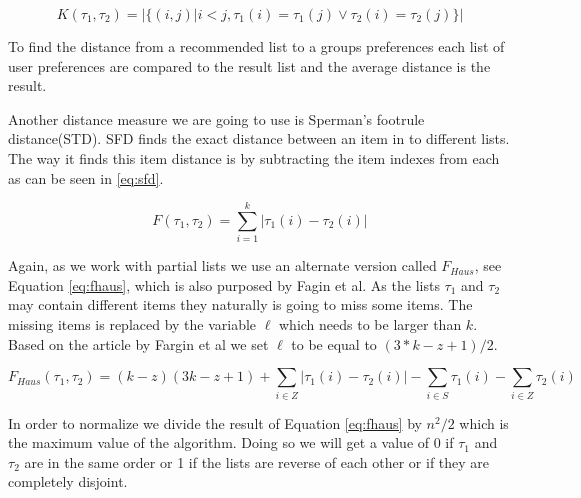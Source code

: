 

\begin{equation}\label{eq:kendalldistance3}
K(\tau_1,\tau_2) = | \{(i,j) | i < j, \tau_1 (i) = \tau_1 (j) \lor \tau_2 (i) = \tau_2 (j) \} |
\end{equation}

To find the distance from a recommended list to a groups preferences each list of user preferences are compared to the result list and the average distance is the result. 


Another distance measure we are going to use is Sperman's footrule distance(STD). SFD finds the exact distance between an item in to different lists. The way it finds this item distance is by subtracting the item indexes from each as can be seen in \ref{eq:sfd}. 

\begin{equation}\label{eq:sfd}
F(\tau_1, \tau_2) = \sum_{i=1}^{k} | \tau_1 (i) - \tau_2 (i) |
\end{equation}

Again, as we work with partial lists we use an alternate version called $F_{Haus}$, see Equation \ref{eq:fhaus}, which is also purposed by Fagin et al\citep{comparing:topk}.
As the lists $\tau_1$ and $\tau_2$ may contain different items they naturally is going to miss some items. The missing items is replaced by the variable $\ell$ which needs to be larger than $k$. Based on the article by Fargin et al we set $\ell$ to be equal to $(3 * k - z + 1)/2$.

\footnotesize
\begin{equation}\label{eq:fhaus}
F_{Haus}(\tau_1,\tau_2)= (k-z)(3k-z+1)+\sum_{i\in Z} | \tau_1 (i) - \tau_2 (i) | - \sum_{i\in S} \tau_1 (i) - \sum_{i\in Z} \tau_2(i)
\end{equation}
\normalsize

In order to normalize we divide the result of Equation \ref{eq:fhaus} by $n^2 /2$ which is the maximum value of the algorithm. Doing so we will get a value of 0 if $\tau_1$ and $\tau_2$ are in the same order or 1 if the lists are reverse of each other or if they are completely disjoint. 